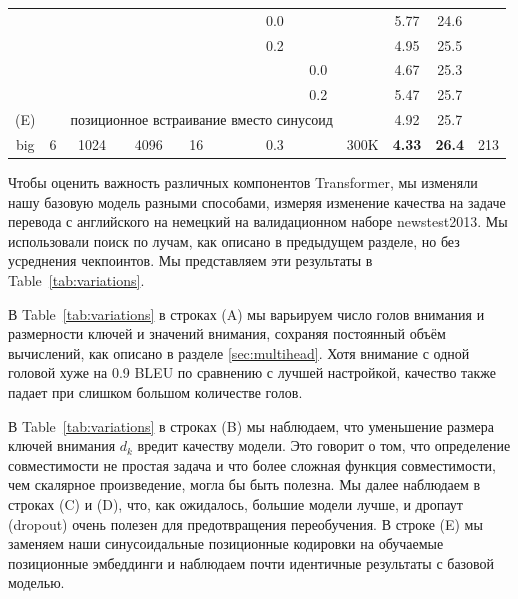 \documentclass{article}
\newcommand\todo[1]{\textcolor{red}{[[#1]]}}
\begin{document}
\begin{table}[t]
\begin{center}
\begin{tabular}{c|ccccccccc|ccc}
& & & & & & & 0.0 & & & 5.77 & 24.6 &  \\
& & & & & & & 0.2 & & & 4.95 & 25.5 &  \\
& & & & & & & & 0.0 & & 4.67 & 25.3 &  \\
& & & & & & & & 0.2 & & 5.47 & 25.7 &  \\
\hline\rule{0pt}{2.0ex}
(E) & & \multicolumn{7}{c}{позиционное встраивание вместо синусоид} & & 4.92 & 25.7 & \\
\hline\rule{0pt}{2.0ex}
big & 6 & 1024 & 4096 & 16 & & & 0.3 & & 300K & \textbf{4.33} & \textbf{26.4} & 213 \\
\hline
\end{tabular}
\end{center}
\end{table}


Чтобы оценить важность различных компонентов Transformer, мы изменяли нашу базовую модель разными способами, измеряя изменение качества на задаче перевода с английского на немецкий на валидационном наборе newstest2013. Мы использовали поиск по лучам, как описано в предыдущем разделе, но без усреднения чекпоинтов. Мы представляем эти результаты в Table~\ref{tab:variations}.  

В Table~\ref{tab:variations} в строках (A) мы варьируем число голов внимания и размерности ключей и значений внимания, сохраняя постоянный объём вычислений, как описано в разделе \ref{sec:multihead}. Хотя внимание с одной головой хуже на 0.9 BLEU по сравнению с лучшей настройкой, качество также падает при слишком большом количестве голов.

В Table~\ref{tab:variations} в строках (B) мы наблюдаем, что уменьшение размера ключей внимания $d_k$ вредит качеству модели. Это говорит о том, что определение совместимости не простая задача и что более сложная функция совместимости, чем скалярное произведение, могла бы быть полезна. Мы далее наблюдаем в строках (C) и (D), что, как ожидалось, большие модели лучше, и дропаут (dropout) очень полезен для предотвращения переобучения. В строке (E) мы заменяем наши синусоидальные позиционные кодировки на обучаемые позиционные эмбеддинги \citep{JonasFaceNet2017} и наблюдаем почти идентичные результаты с базовой моделью.
\end{document}
